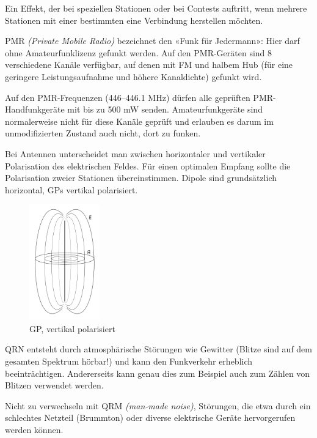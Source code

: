 {Ein Effekt, der bei speziellen Stationen oder bei Contests auftritt, wenn mehrere Stationen mit einer bestimmten eine Verbindung herstellen möchten.}

{PMR \textit{(Private Mobile Radio)} bezeichnet den «Funk für Jedermann»: Hier darf ohne Amateurfunklizenz gefunkt werden. Auf den PMR-Geräten sind 8 verschiedene Kanäle verfügbar, auf denen mit FM und halbem Hub (für eine geringere Leistungsaufnahme und höhere Kanaldichte) gefunkt wird.

Auf den PMR-Frequenzen (446–446.1 MHz) dürfen alle geprüften PMR-Handfunkgeräte mit bis zu 500 mW senden. Amateurfunkgeräte sind normalerweise nicht für diese Kanäle geprüft und erlauben es darum im unmodifizierten Zustand auch nicht, dort zu funken.}

{Bei Antennen unterscheidet man zwischen horizontaler und vertikaler Polarisation des elektrischen Feldes. Für einen optimalen Empfang sollte die Polarisation zweier Stationen übereinstimmen. Dipole sind grundsätzlich horizontal, GPs vertikal polarisiert.

\begin{figure}[h!]
 \centering
 \includegraphics[height=5cm]{./png/Amfu-Antenne-Polarisation.png}
 \caption{GP, vertikal polarisiert}
 \label{fig:polarisation}
\end{figure}

}

{QRN entsteht durch atmosphärische Störungen wie Gewitter (Blitze sind auf dem gesamten Spektrum hörbar!) und kann den Funkverkehr erheblich beeinträchtigen. Andererseits kann genau dies zum Beispiel auch zum Zählen von Blitzen verwendet werden.

Nicht zu verwechseln mit QRM \textit{(man-made noise)}, Störungen, die etwa durch ein schlechtes Netzteil (Brummton) oder diverse elektrische Geräte hervorgerufen werden können.}

